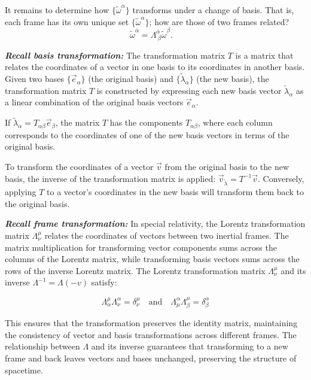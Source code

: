\documentclass[12pt]{book}
\begin{document}
    It remains to determine how \(\{\tilde{\omega}^\alpha\}\) transforms under a change of basis. That is, each frame has its own unique set \(\{\tilde{\omega}^\alpha\}\); how are those of two frames related?
    \[
    \tilde{\omega}^{\bar{\alpha}} = \Lambda^{\bar{\alpha}}_{\ \beta} \tilde{\omega}^\beta. \quad \tag{3.13}
    \]

    \textit{\textbf{Recall basis transformation: }} The transformation matrix \( T \) is a matrix that relates the coordinates of a vector in one basis to its coordinates in another basis. Given two bases \(\{\vec{e}_\alpha\}\) (the original basis) and \(\{\tilde{\lambda}_\alpha\}\) (the new basis), the transformation matrix \( T \) is constructed by expressing each new basis vector \(\tilde{\lambda}_\alpha\) as a linear combination of the original basis vectors \(\vec{e}_\alpha\). 

    If \( \tilde{\lambda}_\alpha = T_{\alpha\beta} \vec{e}_\beta \), the matrix \( T \) has the components \( T_{\alpha\beta} \), where each column corresponds to the coordinates of one of the new basis vectors in terms of the original basis. 
        
    To transform the coordinates of a vector \( \vec{v} \) from the original basis to the new basis, the inverse of the transformation matrix is applied: \( \vec{v}_{\tilde{\lambda}} = T^{-1} \vec{v} \). Conversely, applying \( T \) to a vector's coordinates in the new basis will transform them back to the original basis.

    \textbf{\textit{Recall frame transformation:}} In special relativity, the Lorentz transformation matrix \(\Lambda^\mu_\nu\) relates the coordinates of vectors between two inertial frames. The matrix multiplication for transforming vector components sums across the columns of the Lorentz matrix, while transforming basis vectors sums across the rows of the inverse Lorentz matrix. The Lorentz transformation matrix \(\Lambda^\mu_\nu\) and its inverse \(\Lambda^{-1} = \Lambda(-v)\) satisfy:

    \[
    \Lambda^\mu_\alpha \Lambda^\alpha_\nu = \delta^\mu_\nu
    \quad \text{and} \quad
    \Lambda^\alpha_\mu \Lambda^\mu_\beta = \delta^\alpha_\beta
    \]
    
    This ensures that the transformation preserves the identity matrix, maintaining the consistency of vector and basis transformations across different frames. The relationship between \(\Lambda\) and its inverse guarantees that transforming to a new frame and back leaves vectors and bases unchanged, preserving the structure of spacetime.
\end{document}
